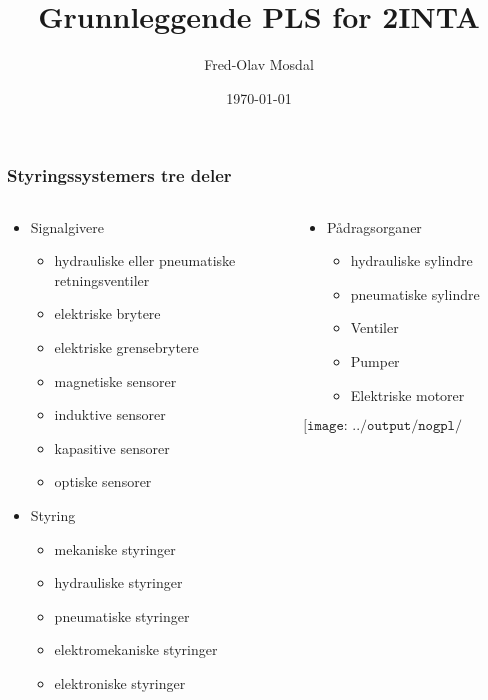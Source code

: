 \documentclass[aspectratio=169,xcolor=dvipsnames]{beamer}
\title[PLS]{Grunnleggende PLS for 2INTA} %
\author[Fred-Olav] {Fred-Olav Mosdal}
\institute[Gand VGS] %
{
    Gand VGS \\
    VG2 Industriteknologi}
\date{\today} %
\begin{document}
\begin{frame}
\titlepage
\end{frame}



\begin{frame}
	\frametitle{Styringssystemers tre deler}
	\begin{columns}
		\begin{column}{0.5\textwidth}
	\begin{itemize}
		\item Signalgivere
			\begin{itemize}
				\item hydrauliske eller pneumatiske retningsventiler 
				\item elektriske brytere 
				\item elektriske grensebrytere 
				\item magnetiske sensorer 
				\item induktive sensorer 
				\item kapasitive sensorer 
				\item optiske sensorer

			\end{itemize}
		\item Styring 
			\begin{itemize}
				\item mekaniske styringer 
				\item hydrauliske styringer 
				\item pneumatiske styringer 
				\item elektromekaniske styringer 
				\item elektroniske styringer
			\end{itemize}
	\end{itemize}
		\end{column}
		\begin{column}{0.5\textwidth}
			\begin{itemize}
		\item Pådragsorganer
			\begin{itemize}
				\item hydrauliske sylindre 
				\item pneumatiske sylindre 
				\item Ventiler 
				\item Pumper 
				\item Elektriske motorer
			\end{itemize}
			\end{itemize}
			\vskip 2cm
	$$\texttt{[image: ../output/nogpl/INTPLC01.png]}$$
		\end{column}
	\end{columns}
\end{frame}
\end{document}
